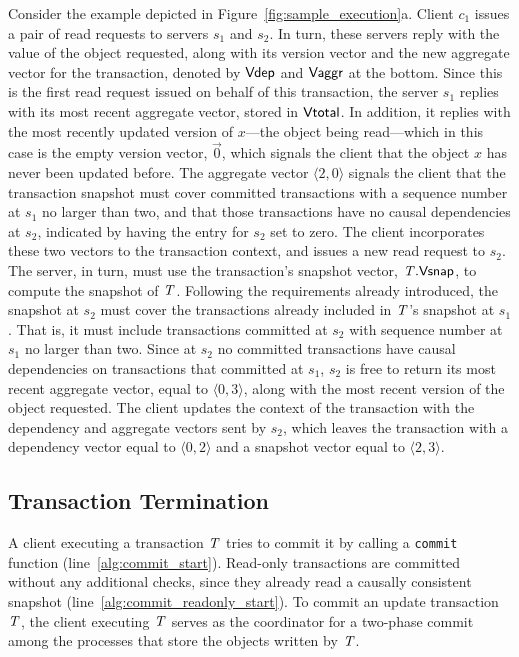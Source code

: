 Consider the example depicted in Figure~\ref{fig:sample_execution}a. Client $c_1$ issues a pair of read requests to servers $s_1$ and $s_2$. In turn, these servers reply with the value of the object requested, along with its version vector and the new aggregate vector for the transaction, denoted by $\mathsf{Vdep}$ and $\mathsf{Vaggr}$ at the bottom. Since this is the first read request issued on behalf of this transaction, the server $s_1$ replies with its most recent aggregate vector, stored in $\mathsf{Vtotal}$. In addition, it replies with the most recently updated version of $x$---the object being read---which in this case is the empty version vector, $\vec{0}$, which signals the client that the object $x$ has never been updated before. The aggregate vector $\langle 2, 0 \rangle$ signals the client that the transaction snapshot must cover committed transactions with a sequence number at $s_1$ no larger than two, and that those transactions have no causal dependencies at $s_2$, indicated by having the entry for $s_2$ set to zero. The client incorporates these two vectors to the transaction context, and issues a new read request to $s_2$. The server, in turn, must use the transaction's snapshot vector, $\mathit{T}.\mathsf{Vsnap}$, to compute the snapshot of $\mathit{T}$. Following the requirements already introduced, the snapshot at $s_2$ must cover the transactions already included in $\mathit{T}$'s snapshot at $s_1$. That is, it must include transactions committed at $s_2$ with sequence number at $s_1$ no larger than two. Since at $s_2$ no committed transactions have causal dependencies on transactions that committed at $s_1$, $s_2$ is free to return its most recent aggregate vector, equal to $\langle 0, 3 \rangle$, along with the most recent version of the object requested. The client updates the context of the transaction with the dependency and aggregate vectors sent by $s_2$, which leaves the transaction with a dependency vector equal to $\langle 0, 2 \rangle$ and a snapshot vector equal to $\langle 2, 3 \rangle$.

\subsection{Transaction Termination}

A client executing a transaction $\mathit{T}$ tries to commit it by calling a {\tt commit} function (line~\ref{alg:commit_start}). Read-only transactions are committed without any additional checks, since they already read a causally consistent snapshot (line~\ref{alg:commit_readonly_start}). To commit an update transaction $\mathit{T}$, the client executing $\mathit{T}$ serves as the coordinator for a two-phase commit among the processes that store the objects written by $\mathit{T}$.

